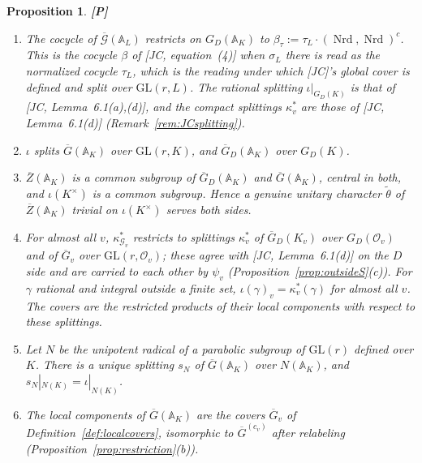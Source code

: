 \documentclass[12pt]{article}
\newcommand{\ov}[1]{\overline{#1}}
\newcommand{\A}{\mathbb{A}}
\newcommand{\cO}{\mathcal{O}}
\newcommand{\Nrd}{\operatorname{Nrd}}
\newcommand{\GL}{\mathrm{GL}}
\newcommand{\Gb}{\ov{G}}
\newcommand{\Zb}{\ov{Z}}
\newcommand{\GDb}{\ov{G}_D}
\newcommand{\ks}{\kappa^{*}}
\newcommand{\cG}{\mathcal{G}}
\newcommand{\cGb}{\ov{\mathcal{G}}}
\newcommand{\Pv}{\textbf{[P]}}
\theoremstyle{plain}
\newtheorem{proposition}[theorem]{Proposition}
\theoremstyle{definition}
\begin{document}
\begin{proposition}\label{prop:global}\Pv
\begin{enumerate}[label=(\alph*)]
\item The cocycle of $\cGb(\A_L)$ restricts on $G_D(\A_K)$ to $\beta_\tau:=\tau_L\cdot(\Nrd,\Nrd)^c$. This is the cocycle $\beta$ of [JC, equation~(4)] when $\sigma_L$ there is read as the normalized cocycle $\tau_L$, which is the reading under which [JC]'s global cover is defined and split over $\GL(r,L)$. The rational splitting $\iota|_{G_D(K)}$ is that of [JC, Lemma~6.1(a),(d)], and the compact splittings $\ks_v$ are those of [JC, Lemma~6.1(d)] (Remark~\ref{rem:JCsplitting}).
\item $\iota$ splits $\Gb(\A_K)$ over $\GL(r,K)$, and $\GDb(\A_K)$ over $G_D(K)$.
\item $\Zb(\A_K)$ is a common subgroup of $\GDb(\A_K)$ and $\Gb(\A_K)$, central in both, and $\iota(K^\times)$ is a common subgroup. Hence a genuine unitary character $\tilde\theta$ of $\Zb(\A_K)$ trivial on $\iota(K^\times)$ serves both sides.
\item For almost all $v$, $\ks_{\cG_v}$ restricts to splittings $\ks_v$ of $\GDb(K_v)$ over $G_D(\cO_v)$ and of $\Gb_v$ over $\GL(r,\cO_v)$; these agree with [JC, Lemma~6.1(d)] on the $D$ side and are carried to each other by $\psi_v$ (Proposition~\ref{prop:outsideS}(c)). For $\gamma$ rational and integral outside a finite set, $\iota(\gamma)_v=\ks_v(\gamma)$ for almost all $v$. The covers are the restricted products of their local components with respect to these splittings.
\item Let $N$ be the unipotent radical of a parabolic subgroup of $\GL(r)$ defined over $K$. There is a unique splitting $s_N$ of $\Gb(\A_K)$ over $N(\A_K)$, and $s_N|_{N(K)}=\iota|_{N(K)}$.
\item The local components of $\Gb(\A_K)$ are the covers $\Gb_v$ of Definition~\ref{def:localcovers}, isomorphic to $\Gb^{(c_v)}$ after relabeling (Proposition~\ref{prop:restriction}(b)).
\end{enumerate}
\end{proposition}
\end{document}
